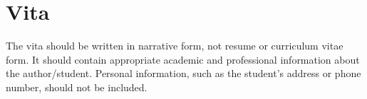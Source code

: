 \chapter*{Vita} \label{vita}

The vita should be written in narrative form, not resume or curriculum vitae form.
It should contain appropriate academic and professional information about the
author/student.
Personal information, such as the student's address or phone number, should not
be included.

